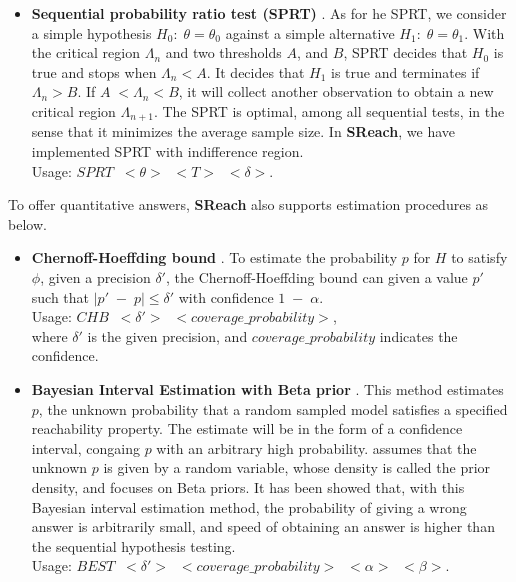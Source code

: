 \begin{itemize}
\item {\bf Sequential probability ratio test (SPRT)} \cite{wald1945sequential}. 
As for he SPRT, we consider a simple hypothesis $H_0:\;\theta = \theta_0$ against a simple alternative $H_1:\;\theta = \theta_1$. With the critical region $\Lambda_n$ and two thresholds $A$, and $B$, SPRT decides that $H_0$ is true and stops when $\Lambda_n < A$. It decides that $H_1$ is true and terminates if $\Lambda_n > B$. If $A\; < \Lambda_n < B$, it will collect another observation to obtain a new critical region $\Lambda_{n+1}$. The SPRT is optimal, among all sequential tests, in the sense that it minimizes the average sample size. In {\bf SReach}, we have implemented SPRT with indifference region.\\ 
Usage: $SPRT\;\; <\theta> \;\;<T>\;\; <\delta>$.
\end{itemize}
To offer quantitative answers, {\bf SReach} also supports estimation procedures as below.
\begin{itemize}

\item {\bf Chernoff-Hoeffding bound} \cite{hoeffding1963probability}. To estimate the probability $p$ for $H$ to satisfy $\phi$, given a precision $\delta'$, the Chernoff-Hoeffding bound can given a value $p'$ such that $|p' \; - \; p| \le \delta'$ with confidence $1\;-\; \alpha$.\\
Usage: $CHB\;\; <\delta'> \;\;<coverage\_ probability>$,\\
where $\delta'$ is the given precision, and $coverage\_ probability$ indicates the confidence.\\

\item {\bf Bayesian Interval Estimation with Beta prior} \cite{zuliani2010bayesian}. This method estimates $p$, the unknown probability that a random sampled model satisfies a specified reachability property. The estimate will be in the form of a confidence interval, congaing $p$ with an arbitrary high probability.  \cite{zuliani2010bayesian} assumes that the unknown $p$ is given by a random variable, whose density is called the prior density, and focuses on Beta priors. It has been showed that, with this Bayesian interval estimation method, the probability of giving a wrong answer is arbitrarily small, and speed of obtaining an answer is higher than the sequential hypothesis testing.\\ Usage: $BEST\;\; <\delta'> \;\;<coverage\_probability>\;\; <\alpha> \;\;<\beta>$.\\
\end{itemize}


